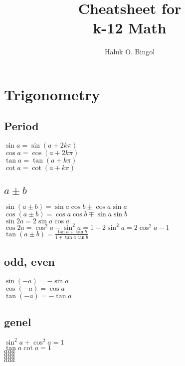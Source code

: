 \documentclass[11pt, oneside]{article}   	%
\title{Cheatsheet for\\ k-12 Math}
\author{Haluk O. Bingol}
\theoremstyle{plain}%
\theoremstyle{definition}
\theoremstyle{remark}
\begin{document}
\maketitle
\noindent

\section{Trigonometry}

\subsection{Period}
$\sin a = \sin (a + 2 k \pi)$\\
$\cos a = \cos (a + 2 k \pi)$\\
$\tan a = \tan (a + k \pi)$\\
$\cot a = \cot (a + k \pi)$\\

\subsection{$a \pm b$}
$\sin (a \pm b) = \sin a \cos b \pm\cos a  \sin a$\\
$\cos(a \pm b) = \cos a \cos b \mp \sin a \sin b$\\
$\sin 2 a = 2 \sin a \cos a$\\
$\cos 2 a 
= \cos^{2} a - \sin^{2} a 
= 1 - 2 \sin^{2} a
= 2 \cos^{2} a - 1$\\
$\tan (a \pm b) = \frac{\tan a + \tan b}{1 \mp \tan a \tan b}$\\



\subsection{odd, even}
$\sin (-a) = - \sin a$\\
$\cos (-a) = \cos a$\\
$\tan (-a) = - \tan a$\\

\subsection{genel}
$\sin^{2} a + \cos^{2} a = 1$\\
$\tan a \cot a = 1$\\

$aaa$\\
$aaa$\\
$aaa$\\
$aaa$\\
\end{document}
